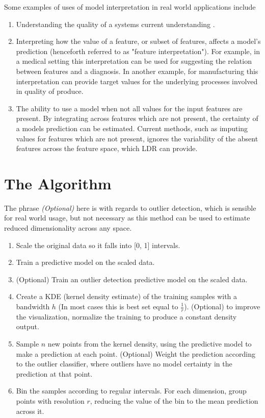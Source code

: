 \documentclass[a4paper, twocolumn]{article}
\begin{document}
Some examples of uses of model interpretation in real world applications include

\begin{enumerate}
\item Understanding the quality of a systems current understanding \cite{amershi2011effective}. 

\item Interpreting how the value of a feature, or subset of features, affects a model's prediction (henceforth referred to as "feature interpretation"). For example, in a medical setting this interpretation can be used for suggesting the relation between features and a diagnosis. In another example, for manufacturing this interpretation can provide target values for the underlying processes involved in quality of produce.

\item The ability to use a model when not all values for the input features are present. By integrating across features which are not present, the certainty of a models prediction can be estimated. Current methods, such as imputing values for features which are not present, ignores the variability of the absent features across the feature space, which LDR can provide.
\end{enumerate}

\section{The Algorithm}

The phrase \textit{(Optional)} here is with regards to outlier detection, which is sensible for real world usage, but not necessary as this method can be used to estimate reduced dimensionality across any space.

\begin{enumerate}
\item Scale the original data so it falls into [0, 1] intervals.
\item Train a predictive model on the scaled data.
\item (Optional) Train an outlier detection predictive model on the scaled data.
\item Create a KDE (kernel density estimate) \cite{parzen1962estimation} of the training samples with a bandwidth $h$ (In most cases this is best set equal to $\frac{1}{r}$). (Optional) to improve the visualization, normalize the training to produce a constant density output.
\item Sample $n$ new points from the kernel density, using the predictive model to make a prediction at each point. (Optional) Weight the prediction according to the outlier classifier, where outliers have no model certainty in the prediction at that point.
\item Bin the samples according to regular intervals. For each dimension, group points with resolution $r$, reducing the value of the bin to the mean prediction across it.
\end{enumerate}
\end{document}
